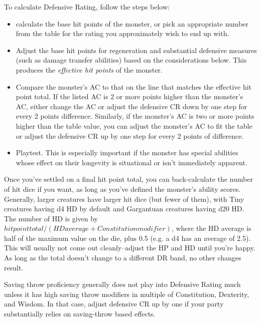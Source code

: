 To calculate Defensive Rating, follow the steps below:
\begin{itemize}
	\item calculate the base hit points of the monster, or pick an appropriate number from the  table for the rating you approximately wish to end up with.
	\item Adjust the base hit points for regeneration and substantial defensive measures (such as damage transfer abilities) based on the considerations below. This produces the \textit{effective hit points} of the monster. 
	\item Compare the monster's AC to that on the line that matches the effective hit point total. If the listed AC is 2 or more points higher than the monster's AC, either change the AC or adjust the defensive CR down by one step for every 2 points difference. Similarly, if the monster's AC is two or more points higher than the table value, you can adjust the monster's AC to fit the table or adjust the defensive CR up by one step for every 2 points of difference.
	\item Playtest. This is especially important if the monster has special abilities whose effect on their longevity is situational or isn't immediately apparent.
\end{itemize}

Once you've settled on a final hit point total, you can back-calculate the number of hit dice if you want, as long as you've defined the monster's ability scores. Generally, larger creatures have larger hit dice (but fewer of them), with Tiny creatures having d4 HD by default and Gargantuan creatures having d20 HD. The number of HD is given by $hit point total/(HD average + Constitution modifier)$, where the HD average is half of the maximum value on the die, plus 0.5 (e.g. a d4 has an average of 2.5). This will usually not come out cleanly--adjust the HP and HD until you're happy. As long as the total doesn't change to a different DR band, no other changes result.

Saving throw proficiency generally does not play into Defensive Rating much unless it has high saving throw modifiers in multiple of Constitution, Dexterity, and Wisdom. In that case, adjust defensive CR up by one if your party substantially relies on saving-throw based effects.


